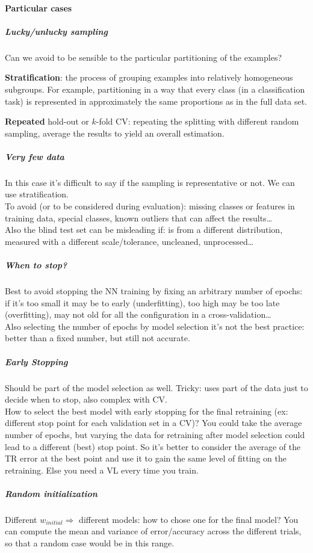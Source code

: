 \documentclass[10pt]{report}
\begin{document}
\paragraph{Particular cases} 
\subparagraph{Lucky/unlucky sampling} Can we avoid to be sensible to the particular partitioning of the examples?
\begin{list}{}{}
	\item \textbf{Stratification}: the process of grouping examples into relatively homogeneous subgroups. For example, partitioning in a way that every class (in a classification task) is represented in approximately the same proportions as in the full data set.\\
	\item  \textbf{Repeated} hold-out or $k$-fold CV: repeating the splitting with different random sampling, average the results to yield an overall estimation.
\end{list}
\subparagraph{Very few data} In this case it's difficult to say if the sampling is representative or not. We can use stratification.\\
To avoid (or to be considered during evaluation): missing classes or features in training data, special classes, known outliers that can affect the results\ldots\\
Also the blind test set can be misleading if: is from a different distribution, measured with a different scale/tolerance, uncleaned, unprocessed\ldots
\subparagraph{When to stop?} Best to avoid stopping the NN training by fixing an arbitrary number of epochs: if it's too small it may be to early (underfitting), too high may be too late (overfitting), may not old for all the configuration in a cross-validation\ldots\\
Also selecting the number of epochs by model selection it's not the best practice: better than a fixed number, but still not accurate.
\subparagraph{Early Stopping} Should be part of the model selection as well. Tricky: uses part of the data just to decide when to stop, also complex with CV.\\
How to select the best model with early stopping for the final retraining (ex: different stop point for each validation set in a CV)? You could take the average number of epochs, but varying the data for retraining after model selection could lead to a different (best) stop point. So it's better to consider the average of the TR error at the best point and use it to gain the same level of fitting on the retraining. Else you need a VL every time you train.
\subparagraph{Random initialization} Different $w_{initial} \Rightarrow$ different models: how to chose one for the final model? You can compute the mean and variance of error/accuracy across the different trials, so that a random case would be in this range.
\end{document}
